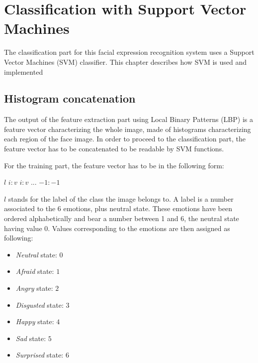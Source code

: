 \chapter{Classification with Support Vector Machines}
\label{chap:implementation_svm}

\noindent The classification part for this facial expression recognition system uses a Support Vector Machines (SVM) classifier. This chapter describes how SVM is used and implemented
\newline

\section{Histogram concatenation}

\vspace{\baselineskip}
\noindent The output of the feature extraction part using Local Binary Patterns (LBP) is a feature vector characterizing the whole image, made of histograms characterizing each region of the face image. In order to proceed to the classification part, the feature vector has to be concatenated to be readable by SVM functions.
\newline

\noindent For the training part, the feature vector has to be in the following form:
\begin{center}
\noindent $ l $ \hspace{0.7cm} $ i:v $ \hspace{0.2cm} $ i:v $ \hspace{0.2cm} $ ... $ \hspace{0.2cm} $ -1:-1 $
\end{center} 
\noindent $ l $ stands for the label of the class the image belongs to. A label is a number associated to the 6 emotions, plus neutral state. These emotions have been ordered alphabetically and bear a number between 1 and 6, the neutral state having value 0. Values corresponding to the emotions are then assigned as following:

\begin{itemize}
	\item \textit{Neutral} state: $ 0 $
	\item \textit{Afraid} state: $ 1 $
	\item \textit{Angry} state: $ 2 $
	\item \textit{Disgusted} state: $ 3 $
	\item \textit{Happy} state: $ 4 $
	\item \textit{Sad} state: $ 5 $
	\item \textit{Surprised} state: $ 6 $
\end{itemize}

